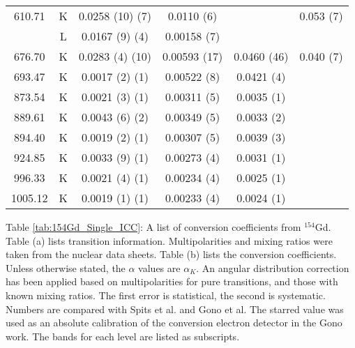 \begin{table}
\begin{ThreePartTable}
\begin{tabular}{c|c|c|c|c|c}
            \hline
            610.71	& K &	0.0258	(10) (7)	&	0.0110 (6)	& &	0.053 (7)	\\
            		& L &	0.0167	(9) (4)	&	0.00158 (7)	&		\\
            \hline
            676.70	& K &	0.0283	(4) (10)	&	0.00593 (17)	&	0.0460 (46) & 0.040 (7)	\\
            \hline
            693.47	& K &	0.0017	(2) (1)	&	0.00522 (8)	&	0.0421 (4)	\\
            \hline
            873.54	& K &	0.0021	(3)	(1) &	0.00311 (5)	&	0.0035 (1)	\\
            \hline
            889.61	& K &	0.0043	(6) (2)	&	0.00349 (5)	&	0.0033 (2)	\\
            \hline
            894.40	& K &	0.0019	(2) (1)	&	0.00307 (5)	&	0.0039 (3)	\\
            \hline
            924.85	& K &	0.0033	(9) (1)	&	0.00273 (4)	&	0.0031 (1)	\\
            \hline
            996.33	& K &	0.0021	(4) (1)	&	0.00234 (4)	&	0.0025 (1)	\\
            \hline
            1005.12	& K &	0.0019	(1) (1)	&	0.00233 (4)	&	0.0024 (1)	\\
            \bottomrule
        \end{tabular}
        \begin{tablenotes}[para]
            Table \ref{tab:154Gd_Single_ICC}: A list of conversion coefficients from $^{154}$Gd. Table (a) lists transition information. Multipolarities and mixing ratios were taken from the nuclear data sheets\citep{reich09:_nds_154}. Table (b) lists the conversion coefficients. Unless otherwise stated, the $\alpha$ values are $\alpha_K$. An angular distribution correction has been applied based on multipolarities for pure transitions, and those with known mixing ratios. The first error is statistical, the second is systematic. Numbers are compared with Spits et al.\citep{spits96:_154gd} and Gono et al.\citep{gono74:_154gd_e0} The starred value was used as an absolute calibration of the conversion electron detector in the Gono work. The bands for each level are listed as subscripts.
        \end{tablenotes}
\end{ThreePartTable}
\end{table}
